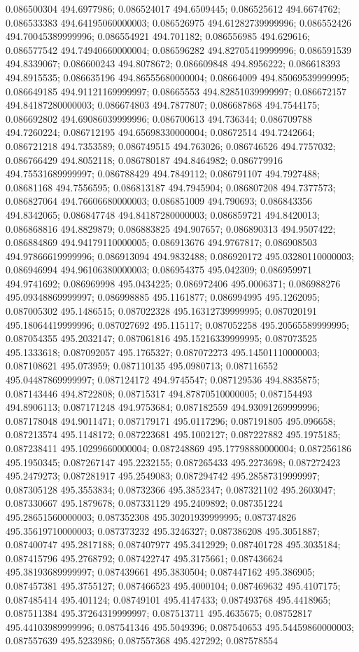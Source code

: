 0.086500304 494.6977986; 0.086524017 494.6509445; 0.086525612 494.6674762; 0.086533383 494.64195060000003; 0.086526975 494.61282739999996; 0.086552426 494.70045389999996; 0.086554921 494.701182; 0.086556985 494.629616; 0.086577542 494.74940660000004; 0.086596282 494.82705419999996; 0.086591539 494.8339067; 0.086600243 494.8078672; 0.086609848 494.8956222; 0.086618393 494.8915535; 0.086635196 494.86555680000004; 0.08664009 494.85069539999995; 0.086649185 494.91121169999997; 0.08665553 494.82851039999997; 0.086672157 494.84187280000003; 0.086674803 494.7877807; 0.086687868 494.7544175; 0.086692802 494.69086039999996; 0.086700613 494.736344; 0.086709788 494.7260224; 0.086712195 494.65698330000004; 0.08672514 494.7242664; 0.086721218 494.7353589; 0.086749515 494.763026; 0.086746526 494.7757032; 0.086766429 494.8052118; 0.086780187 494.8464982; 0.086779916 494.75531689999997; 0.086788429 494.7849112; 0.086791107 494.7927488; 0.08681168 494.7556595; 0.086813187 494.7945904; 0.086807208 494.7377573; 0.086827064 494.76606680000003; 0.086851009 494.790693; 0.086843356 494.8342065; 0.086847748 494.84187280000003; 0.086859721 494.8420013; 0.086868816 494.8829879; 0.086883825 494.907657; 0.086890313 494.9507422; 0.086884869 494.94179110000005; 0.086913676 494.9767817; 0.086908503 494.97866619999996; 0.086913094 494.9832488; 0.086920172 495.03280110000003; 0.086946994 494.96106380000003; 0.086954375 495.042309; 0.086959971 494.9741692; 0.086969998 495.0434225; 0.086972406 495.0006371; 0.086988276 495.09348869999997; 0.086998885 495.1161877; 0.086994995 495.1262095; 0.087005302 495.1486515; 0.087022328 495.16312739999995; 0.087020191 495.18064419999996; 0.087027692 495.115117; 0.087052258 495.20565589999995; 0.087054355 495.2032147; 0.087061816 495.15216339999995; 0.087073525 495.1333618; 0.087092057 495.1765327; 0.087072273 495.14501110000003; 0.087108621 495.073959; 0.087110135 495.0980713; 0.087116552 495.04487869999997; 0.087124172 494.9745547; 0.087129536 494.8835875; 0.087143446 494.8722808; 0.08715317 494.87870510000005; 0.087154493 494.8906113; 0.087171248 494.9753684; 0.087182559 494.93091269999996; 0.087178048 494.9011471; 0.087179171 495.0117296; 0.087191805 495.096658; 0.087213574 495.1148172; 0.087223681 495.1002127; 0.087227882 495.1975185; 0.087238411 495.10299660000004; 0.087248869 495.17798880000004; 0.087256186 495.1950345; 0.087267147 495.2232155; 0.087265433 495.2273698; 0.087272423 495.2479273; 0.087281917 495.2549083; 0.087294742 495.28587319999997; 0.087305128 495.3553834; 0.08732366 495.3852347; 0.087321102 495.2603047; 0.087330667 495.1879678; 0.087331129 495.2409892; 0.087351224 495.28651560000003; 0.087352308 495.30201939999995; 0.087374826 495.35619710000003; 0.087373232 495.3246327; 0.087386208 495.3051887; 0.087400747 495.2817188; 0.087407977 495.3412929; 0.087401728 495.3035184; 0.087415796 495.2768792; 0.087422747 495.3175661; 0.087436624 495.38193689999997; 0.087439661 495.3830504; 0.087447162 495.386905; 0.087457381 495.3755127; 0.087466523 495.4000104; 0.087469632 495.4107175; 0.087485414 495.401124; 0.08749101 495.4147433; 0.087493768 495.4418965; 0.087511384 495.37264319999997; 0.087513711 495.4635675; 0.08752817 495.44103989999996; 0.087541346 495.5049396; 0.087540653 495.54459860000003; 0.087557639 495.5233986; 0.087557368 495.427292; 0.087578554 